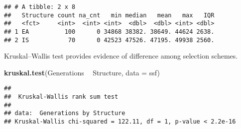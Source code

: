 \documentclass[]{book}
\newenvironment{Shaded}{\begin{snugshade}}{\end{snugshade}}
\newcommand{\CharTok}[1]{\textcolor[rgb]{0.31,0.60,0.02}{#1}}
\newcommand{\DataTypeTok}[1]{\textcolor[rgb]{0.13,0.29,0.53}{#1}}
\newcommand{\DecValTok}[1]{\textcolor[rgb]{0.00,0.00,0.81}{#1}}
\newcommand{\KeywordTok}[1]{\textcolor[rgb]{0.13,0.29,0.53}{\textbf{#1}}}
\newcommand{\NormalTok}[1]{#1}
\newcommand{\OperatorTok}[1]{\textcolor[rgb]{0.81,0.36,0.00}{\textbf{#1}}}
\newcommand{\OtherTok}[1]{\textcolor[rgb]{0.56,0.35,0.01}{#1}}
\newcommand{\StringTok}[1]{\textcolor[rgb]{0.31,0.60,0.02}{#1}}
\begin{document}
\begin{Shaded}
\end{Shaded}

\begin{verbatim}
## # A tibble: 2 x 8
##   Structure count na_cnt   min median   mean   max   IQR
##   <fct>     <int>  <int> <int>  <dbl>  <dbl> <int> <dbl>
## 1 EA          100      0 34868 38382. 38649. 44624 2638.
## 2 IS           70      0 42523 47526. 47195. 49938 2560.
\end{verbatim}

Kruskal--Wallis test provides evidence of difference among selection schemes.

\begin{Shaded}
\begin{Highlighting}[]
\KeywordTok{kruskal.test}\NormalTok{(Generations }\OperatorTok{~}\StringTok{ }\NormalTok{Structure, }\DataTypeTok{data =}\NormalTok{ ssf)}
\end{Highlighting}
\end{Shaded}

\begin{verbatim}
## 
##  Kruskal-Wallis rank sum test
## 
## data:  Generations by Structure
## Kruskal-Wallis chi-squared = 122.11, df = 1, p-value < 2.2e-16
\end{verbatim}
\end{document}
